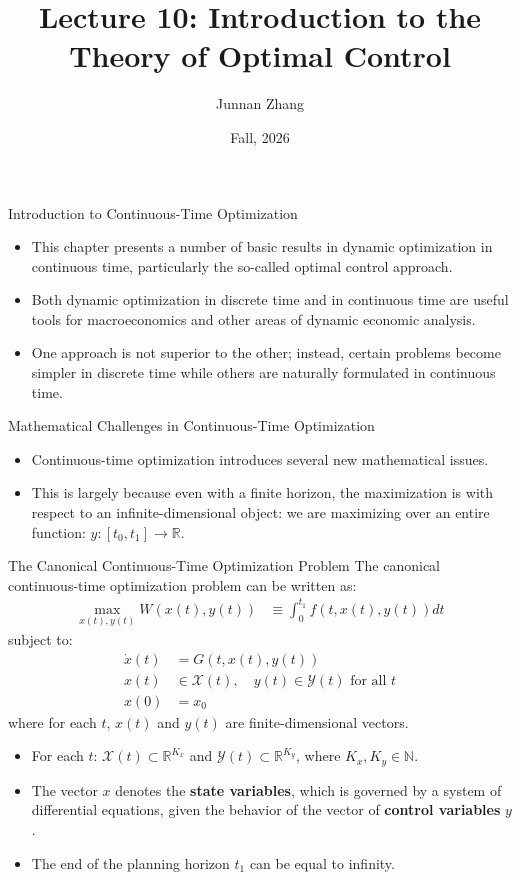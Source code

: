 \documentclass[9pt,aspectratio=169]{beamer}
\title{Lecture 10: Introduction to the Theory of Optimal Control}
\author{Junnan Zhang} %
\institute[Paula and Gregory Chow Institute for Studies in Economics\\
Xiamen University] %
{
	Paula and Gregory Chow Institute for Studies in Economics \\ Xiamen University  \\ %
	\medskip
}
\date{Fall, 2026} %
\newcommand{\X}{\mathcal{X}}
\newcommand{\Y}{\mathcal{Y}}
\begin{document}
\frame{\titlepage}

\begin{frame}{Introduction to Continuous-Time Optimization}
    \begin{itemize}
        \item This chapter presents a number of basic results in dynamic
        optimization in continuous time, particularly the so-called optimal
        control approach.
        \item Both dynamic optimization in discrete time and in continuous
        time are useful tools for macroeconomics and other areas of dynamic
        economic analysis.
        \item One approach is not superior to the other; instead, certain
        problems become simpler in discrete time while others are naturally
        formulated in continuous time.
    \end{itemize}
\end{frame}

\begin{frame}{Mathematical Challenges in Continuous-Time Optimization}
    \begin{itemize}
        \item Continuous-time optimization introduces several new
        mathematical issues.
        \item This is largely because even with a finite horizon, the
        maximization is with respect to an infinite-dimensional object: we
        are maximizing over an entire function: $y : [t_0, t_1] \rightarrow
        \mathbb{R}$.
    \end{itemize}
\end{frame}

\begin{frame}{The Canonical Continuous-Time Optimization Problem}
The canonical continuous-time optimization problem can be written as:
\begin{align*}
\max_{x(t),y(t)} W(x(t), y(t)) &\equiv \int_0^{t_1} f(t, x(t), y(t))dt
\end{align*}
subject to:
\begin{align*}
\dot{x}(t) &= G(t, x(t), y(t))\\
x(t) &\in \X(t), \quad y(t) \in \Y(t) \text{ for all } t\\
x(0) &= x_0
\end{align*}
where for each $t$, $x(t)$ and $y(t)$ are finite-dimensional vectors.

\begin{itemize}
\item For each $t$: $\X(t) \subset \mathbb{R}^{K_x}$ and $\Y(t) \subset \mathbb{R}^{K_y}$, where $K_x, K_y \in \mathbb{N}$.
\item The vector $x$ denotes the \textbf{state variables}, which is governed by a
system of differential equations, given the behavior of the vector of \textbf{control
variables} $y$.
\item The end of the planning horizon $t_1$ can be equal to infinity.
\end{itemize}
\end{frame}
\end{document}
